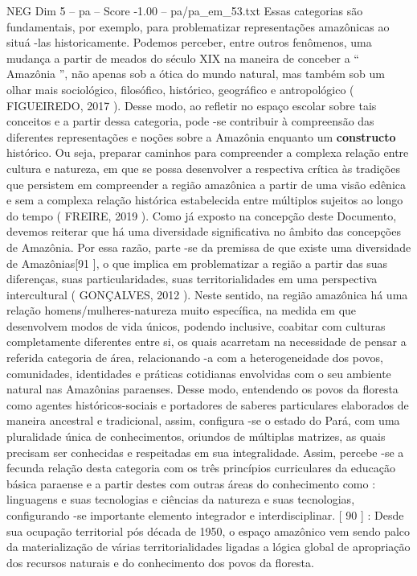 \begin{textsample}{NEG Dim 5 – pa – Score -1.00 – pa/pa\_em\_53.txt}
Essas categorias são fundamentais, por exemplo, para problematizar representações amazônicas ao situá -las historicamente.
Podemos perceber, entre outros fenômenos, uma mudança a partir de meados do século XIX na maneira de conceber a “ Amazônia ”, não apenas sob a ótica do mundo natural, mas também sob um olhar mais sociológico, filosófico, histórico, geográfico e antropológico ( FIGUEIREDO, 2017 ).
Desse modo, ao refletir no espaço escolar sobre tais conceitos e a partir dessa categoria, pode -se contribuir à compreensão das diferentes representações e noções sobre a Amazônia enquanto um \textbf{constructo} histórico.
Ou seja, preparar caminhos para compreender a complexa relação entre cultura e natureza, em que se possa desenvolver a respectiva crítica às tradições que persistem em compreender a região amazônica a partir de uma visão edênica e sem a complexa relação histórica estabelecida entre múltiplos sujeitos ao longo do tempo ( FREIRE, 2019 ).
Como já exposto na concepção deste Documento, devemos reiterar que há uma diversidade significativa no âmbito das concepções de Amazônia.
Por essa razão, parte -se da premissa de que existe uma diversidade de Amazônias[91 ], o que implica em problematizar a região a partir das suas diferenças, suas particularidades, suas territorialidades em uma perspectiva intercultural ( GONÇALVES, 2012 ).
Neste sentido, na região amazônica há uma relação homens/mulheres-natureza muito específica, na medida em que desenvolvem modos de vida únicos, podendo inclusive, coabitar com culturas completamente diferentes entre si, os quais acarretam na necessidade de pensar a referida categoria de área, relacionando -a com a heterogeneidade dos povos, comunidades, identidades e práticas cotidianas envolvidas com o seu ambiente natural nas Amazônias paraenses.
Desse modo, entendendo os povos da floresta como agentes históricos-sociais e portadores de saberes particulares elaborados de maneira ancestral e tradicional, assim, configura -se o estado do Pará, com uma pluralidade única de conhecimentos, oriundos de múltiplas matrizes, as quais precisam ser conhecidas e respeitadas em sua integralidade.
Assim, percebe -se a fecunda relação desta categoria com os três princípios curriculares da educação básica paraense e a partir destes com outras áreas do conhecimento como : linguagens e suas tecnologias e ciências da natureza e suas tecnologias, configurando -se importante elemento integrador e interdisciplinar. [ 90 ] : Desde sua ocupação territorial pós década de 1950, o espaço amazônico vem sendo palco da materialização de várias territorialidades ligadas a lógica global de apropriação dos recursos naturais e do conhecimento dos povos da floresta.

\end{textsample}
